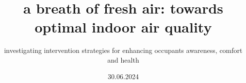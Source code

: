 \title{a breath of fresh air: towards optimal indoor air quality}
\subtitle{investigating intervention strategies for enhancing occupants awareness, comfort and health}

\date{30.06.2024}